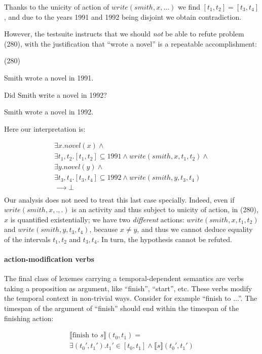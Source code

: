 \documentclass[a4paper,11pt]{article}
\newcommand\hyp{\item[H]}
\newcommand\fracasex[2]{\begin{lingex}\item[(#1)] \begin{subex} #2 \end{subex} \end{lingex} }
\begin{document}
Thanks to the unicity of action of $write(smith,x,...)$ we find
\([t_1,t_2] = [t_3,t_4]\), and due to the years 1991 and 1992 being
disjoint we obtain contradiction.

However, the testsuite instructs that we should \emph{not} be able to refute
problem (280), with the justification that ``wrote a novel'' is a repeatable
accomplishment:

\fracasex{280}{
\item	Smith wrote a novel in 1991.
\item 	Did Smith write a novel in 1992?
\hyp 	Smith wrote a novel in 1992.
}
Here our interpretation is:

\[\begin{array}{l}
∃x. novel(x) ∧ \\
∃t_1,t_2. [t_1,t_2] ⊆ 1991 ∧ write(smith,x,t_1,t_2) ∧ \\
∃y. novel(y) ∧ \\
∃t_3,t_4. [t_3,t_4] ⊆ 1992 ∧ write(smith,y,t_3,t_4) \\
⟶ ⊥ \\
\end{array}
\]
Our analysis does not need to treat this last case specially. Indeed,
even if $write(smith,x,.,.)$ is an activity and thus subject to
unicity of action, in (280), $x$ is quantified existentially; we have
two \emph{different} actions: $write(smith,x,t_1,t_2)$ and
$write(smith,y,t_3,t_4)$, because $x \neq y$, and thus we cannot deduce equality of the
intervals $t_1,t_2$ and $t_3,t_4$. In turn, the hypothesis cannot be refuted.

\paragraph{action-modification verbs}

The final class of lexemes carrying a temporal-dependent semantics are
verbs taking a proposition as argument, like ``finish'', ``start'',
etc. These verbs modify the temporal context in non-trivial
ways. Consider for example ``finish to ...''. The timespan of the
argument of ``finish'' should end within the timespan of the finishing
action:

\begin{multline*}
⟦\text{finish to \(s\)}⟧(t_0,t_1) = \\ ∃(t_0',t_1'). t_1' ∈ [t_0,t_1] ∧ ⟦s⟧(t_0',t_1')
\end{multline*}
\end{document}
